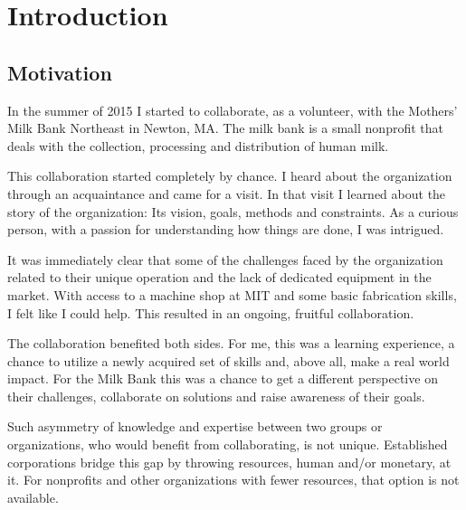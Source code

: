 \chapter{Introduction}
\label{chap_intro}

\section{Motivation}
In the summer of 2015 I started to collaborate, as a volunteer, with the Mothers’ Milk Bank Northeast in Newton, MA. The milk bank is a small nonprofit that deals with the collection, processing and distribution of human milk.

This collaboration started completely by chance. I heard about the organization through an acquaintance and came for a visit. In that visit I learned about the story of the organization: Its vision, goals, methods and constraints. As a curious person, with a passion for understanding how things are done, I was intrigued. 

It was immediately clear that some of the challenges faced by the organization related to their unique operation and the lack of dedicated equipment in the market. With access to a machine shop at MIT and some basic fabrication skills, I felt like I could help. This resulted in an ongoing, fruitful collaboration. 

The collaboration benefited both sides. For me, this was a learning experience, a chance to utilize a newly acquired set of skills and, above all, make a real world impact. For the Milk Bank this was a chance to get a different perspective on their challenges, collaborate on solutions and raise awareness of their goals.   

Such asymmetry of knowledge and expertise between two groups or organizations, who would benefit from collaborating, is not unique. Established corporations bridge this gap by throwing resources, human and/or monetary, at it. For nonprofits and other organizations with fewer resources, that option is not available.

